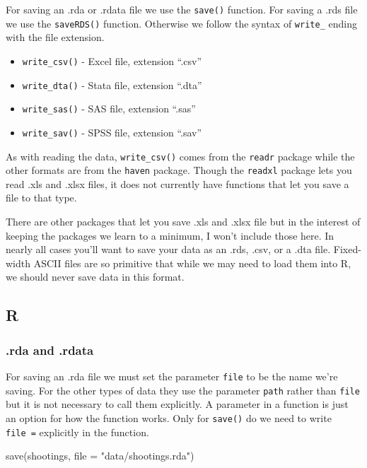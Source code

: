 \documentclass[
  a4paper,
]{krantz}
\makeatletter
\newenvironment{Shaded}{\begin{snugshade}}{\end{snugshade}}
\newcommand{\AttributeTok}[1]{\textcolor[rgb]{0.77,0.63,0.00}{#1}}
\newcommand{\FunctionTok}[1]{\textcolor[rgb]{0.00,0.00,0.00}{#1}}
\newcommand{\NormalTok}[1]{#1}
\newcommand{\StringTok}[1]{\textcolor[rgb]{0.31,0.60,0.02}{#1}}
\providecommand{\tightlist}{%
  \setlength{\itemsep}{0pt}\setlength{\parskip}{0pt}}
\newenvironment{kframe}{%
\medskip{}
\setlength{\fboxsep}{.8em}
 \def\at@end@of@kframe{}%
 \ifinner\ifhmode%
  \def\at@end@of@kframe{\end{minipage}}%
  \begin{minipage}{\columnwidth}%
 \fi\fi%
 \def\FrameCommand##1{\hskip\@totalleftmargin \hskip-\fboxsep
 \colorbox{shadecolor}{##1}\hskip-\fboxsep
     \hskip-\linewidth \hskip-\@totalleftmargin \hskip\columnwidth}%
 \MakeFramed {\advance\hsize-\width
   \@totalleftmargin\z@ \linewidth\hsize
   \@setminipage}}%
 {\par\unskip\endMakeFramed%
 \at@end@of@kframe}
\renewenvironment{Shaded}{\begin{kframe}}{\end{kframe}}
\makeatother
\begin{document}
For saving an .rda or .rdata file we use the \texttt{save()}
function. For saving a .rds file we use the
\texttt{saveRDS()} function. Otherwise we follow the syntax
of \texttt{write\_} ending with the file extension.

\begin{itemize}
\tightlist
\item
  \texttt{write\_csv()} - Excel file, extension ``.csv''
\item
  \texttt{write\_dta()} - Stata file, extension ``.dta''
\item
  \texttt{write\_sas()} - SAS file, extension ``.sas''
\item
  \texttt{write\_sav()} - SPSS file, extension ``.sav''
\end{itemize}

As with reading the data, \texttt{write\_csv()} comes from
the \texttt{readr} package while the other formats are from
the \texttt{haven} package. Though the \texttt{readxl}
package lets you read .xls and .xlsx files, it does not
currently have functions that let you save a file to that
type.

There are other packages that let you save .xls and .xlsx
file but in the interest of keeping the packages we learn to
a minimum, I won't include those here. In nearly all cases
you'll want to save your data as an .rds, .csv, or a .dta
file. Fixed-width ASCII files are so primitive that while we
may need to load them into R, we should never save data in
this format.

\hypertarget{r-1}{%
\subsection{R}\label{r-1}}

\hypertarget{rda-and-.rdata}{%
\subsubsection{.rda and .rdata}\label{rda-and-.rdata}}

For saving an .rda file we must set the parameter
\texttt{file} to be the name we're saving. For the other
types of data they use the parameter \texttt{path} rather
than \texttt{file} but it is not necessary to call them
explicitly. A parameter in a function is just an option for
how the function works. Only for \texttt{save()} do we need
to write \texttt{file\ =} explicitly in the function.

\begin{Shaded}
\begin{Highlighting}[]
\FunctionTok{save}\NormalTok{(shootings, }\AttributeTok{file =} \StringTok{"data/shootings.rda"}\NormalTok{)}
\end{Highlighting}
\end{Shaded}
\end{document}
